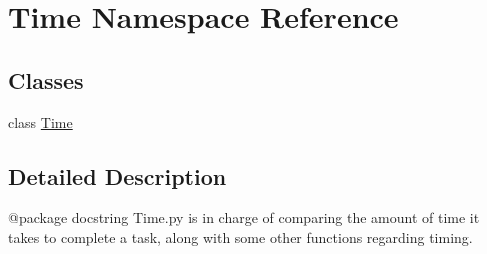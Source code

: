 \hypertarget{namespace_time}{}\section{Time Namespace Reference}
\label{namespace_time}
\subsection*{Classes}
\begin{DoxyCompactItemize}
\item 
class \hyperlink{class_time_1_1_time}{Time}
\end{DoxyCompactItemize}


\subsection{Detailed Description}
\begin{DoxyVerb}@package docstring
Time.py is in charge of comparing the amount of time it takes to complete a task, along with some other functions regarding timing.
\end{DoxyVerb}
 